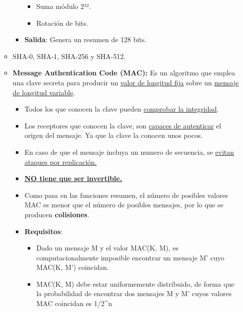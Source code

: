 \documentclass[12pt, twoside, openright]{report} %
\begin{document}
\begin{itemize}
\begin{itemize}
\begin{itemize}
\begin{itemize}
        \item Suma módulo 2³².
          
        \item Rotación de bits.
          
        \end{itemize}
      \item \textbf{Salida}: Genera un resumen de 128 bits.
        
      \end{itemize}
    \item SHA-0, SHA-1, SHA-256 y SHA-512.
      
    \item \textbf{Message Authentication Code (MAC):} Es un algoritmo que
      emplea una clave secreta para producir un \underline{valor de
      longitud fija} sobre un \underline{mensaje de longitud variable}.
      

      \begin{itemize}
      \item Todos los que conocen la clave pueden \underline{comprobar la
        integridad}.
        
      \item Los receptores que conocen la clave, son \underline{capaces de
        autenticar} el origen del mensaje. Ya que la clave la conocen
        unos pocos.
        
      \item En caso de que el mensaje incluya un numero de secuencia, se
        \underline{evitan ataques por replicación.}
        
      \item \textbf{\underline{NO tiene que ser invertible.}}
        
      \item Como pasa en las funciones resumen, el número de posibles
        valores MAC es menor que el número de posibles mensajes, por lo
        que se producen \textbf{colisiones}.
        
      \item \textbf{Requisitos}:
        

        \begin{itemize}
        \item Dado un mensaje M y el valor MAC(K, M), es computacionalmente
          imposible encontrar un mensaje M' cuyo MAC(K, M') coincidan.
          
        \item MAC(K, M) debe estar uniformemente distribuido, de forma que la
          probabilidad de encontrar dos mensajes M y M' cuyos valores
          MAC coincidan es 1/2\^{}n
          

\end{itemize}
\end{itemize}
\end{itemize}
\end{itemize}
\end{document}
